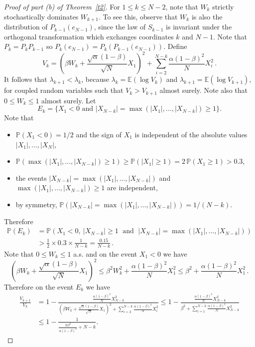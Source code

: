 \documentclass[12pt]{article}
\newcommand{\1}{\mathbf{1}}
\begin{document}
\vspace{1cm}
\begin{proof}[Proof of part (b) of Theorem~\ref{t2}]
For $1 \le k \le N-2$, note that $W_k$ strictly stochastically dominates $W_{k+1}$. To see this, observe that $W_k$ is also the distribution of $P_{k-1}(e_{N-1})$, since the law of $S_{k-1}$ is invariant under the orthogonal transformation which exchanges coordinates $k$ and $N-1$. Note that $P_k = P_k P_{k-1}$ so $P_{k}(e_{N-1}) = P_{k}(P_{k-1}(e_{N-1})) $.
Define
$$
V_k = \left(\beta W_k + \frac{\sqrt{\alpha}(1-\beta)}{\sqrt{N}}X_1\right)^2 + \sum_{i=2}^{N-k}\frac{\alpha(1-\beta)^2}{N} X_i^2 \,.
$$
It follows that $\lambda_{k+1} < \lambda_k$, because $\lambda_k = \mathbb{E}(\log V_k)$ and $\lambda_{k+1} = \mathbb{E}\left(\log V_{k+1}\right)$, for coupled random variables such that $V_k > V_{k+1}$ almost surely.  
Note also that $0 \le W_k \le 1$ almost surely. Let 
$$
E_k=\{X_1 < 0
\text{ and }|X_{N-k}|=\max(|X_1|, \dots, |X_{N-k}|)\ge 1\}.
$$
Note that
\begin{itemize}
\item $\mathbb{P}(X_1<0)=1/2$ and the sign of $X_1$ is independent of the absolute values $|X_1|, \dots, |X_N|$,
\item 
$\mathbb{P}(\max(|X_1|,\dots,|X_{N-k}|)\ge 1)\ge \mathbb{P}(|X_1| \ge 1)= 2\,\mathbb{P}(X_1 \ge 1) > 0.3$, 
\item the events $|X_{N-k}|=\max(|X_1|,\dots,|X_{N-k}|) $ and $\max(|X_1|,\dots,|X_{N-k}|)  \ge 1 $ are independent,
\item 
by symmetry, $\mathbb{P}(|X_{N-k}| = \max(|X_1|, \dots, |X_{N-k}|)) = 1/(N-k)$.
\end{itemize} 
Therefore
\begin{align*} 
\mathbb{P}\left(E_k\right)  & =  \mathbb{P}(X_1 < 0,\ |X_{N-k}| \ge 1 \;\text{ and }\;|X_{N-k}| = \max(|X_1|, \dots, |X_{N-k}|))  
\\ & >  \frac12 \times 0.3 \times \frac1{N-k}=\frac{0.15}{N-k}\,.
\end{align*} 
Note that $0 \le W_k \le 1$ a.s. and on the event $X_1 < 0$ we have
$$
\left(\beta W_k + \frac{\sqrt{\alpha}(1-\beta)}{\sqrt{N}} X_1\right)^2 \le \beta^2 W_k^2 + \frac{\alpha(1-\beta)^2}{N} X_1^2 \le \beta^2 + \frac{\alpha(1-\beta)^2}{N} X_1^2\,.
$$ 
Therefore on the event $E_k$ we have
\begin{align*}
\frac{V_{k+1}}{V_k} &= 1 - \frac{\frac{\alpha(1-\beta)^2}{N}X_{N-k}^2}{\left(\beta W_k + \frac{\sqrt{\alpha}(1-\beta)}{\sqrt{N}}X_1\right)^2 + \sum_{i=2}^{N-k}\frac{\alpha(1-\beta)^2}{N} X_i^2} \le 1 - \frac{\frac{\alpha(1-\beta)^2}{N}X_{N-k}^2}{\beta^2  + \sum_{i=1}^{N-k}\frac{\alpha(1-\beta)^2}{N} X_{N-k}^2} \\ & \le 1 - \frac{1}{\frac{N\beta^2}{\alpha(1-\beta)^2} + N-k}.

\end{align*}
\end{proof}
\end{document}
